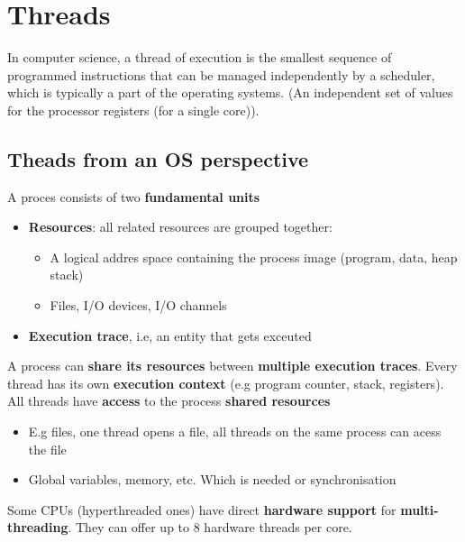 \documentclass{article}
\begin{document}
\section{Threads}

\begin{flushleft}
In computer science, a thread of execution is the smallest sequence of programmed instructions that can be managed independently by a scheduler, which is typically a part of the operating systems. (An independent set of values for the processor registers (for a single core)).
\end{flushleft}

\subsection{Theads from an OS perspective}
\begin{flushleft}
A proces consists of two \textbf{fundamental units}
\begin{itemize}
	\item \textbf{Resources}: all related resources are grouped together:
	\begin{itemize}
		\item A logical addres space containing the process image (program, data, heap stack)
		\item Files, I/O devices, I/O channels
	\end{itemize}
	\item \textbf{Execution trace}, i.e, an entity that gets exceuted
\end{itemize}
A process can \textbf{share its resources} between \textbf{multiple execution traces}. Every thread has its own \textbf{execution context} (e.g program counter, stack, registers).\\
All threads have \textbf{access} to the process \textbf{shared resources}
\begin{itemize}
	\item E.g files, one thread opens a file, all threads on the same process can acess the file
	\item Global variables, memory, etc. Which is needed or synchronisation
\end{itemize}
Some CPUs (hyperthreaded ones) have direct \textbf{hardware support} for \textbf{multi-threading}. They can offer up to 8 hardware threads per core.
\end{flushleft}
\bigskip
\end{document}
